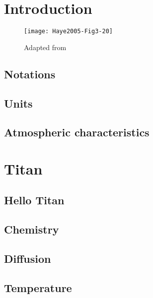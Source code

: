 \documentclass{report}
\begin{document}
\title{\PINC}
\author{S.~Plessis \and K.~Mandt \and T.~Greathouse}
\date{\theversion}
\maketitle

\tableofcontents

\part{Introduction}
\begin{figure}
\centering
\texttt{[image: Haye2005-Fig3-20]}
\caption{Adapted from \cite{Haye2005}}
\end{figure}
\chapter{Notations}


\chapter{Units}


\chapter{Atmospheric characteristics}


\part{Titan}
\chapter{Hello Titan}


\chapter{Chemistry}


\chapter{Diffusion}


\chapter{Temperature}

\end{document}
